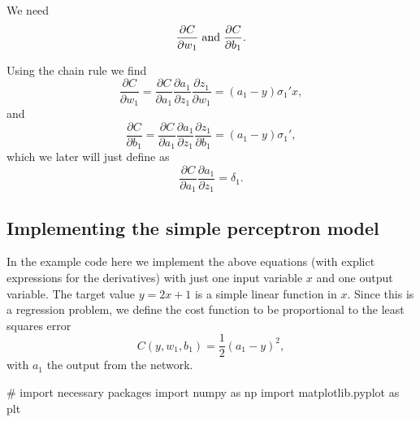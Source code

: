 \documentclass[%
oneside,                 %
final,                   %
10pt]{article}
\begin{document}
We need
\[
\frac{\partial C}{\partial w_1} \hspace{0.1cm}\mathrm{and}\hspace{0.1cm}\frac{\partial C}{\partial b_1}. 
\]

Using the chain rule we find 
\[
\frac{\partial C}{\partial w_1}=\frac{\partial C}{\partial a_1}\frac{\partial a_1}{\partial z_1}\frac{\partial z_1}{\partial w_1}=(a_1-y)\sigma_1'x,
\]
and
\[
\frac{\partial C}{\partial b_1}=\frac{\partial C}{\partial a_1}\frac{\partial a_1}{\partial z_1}\frac{\partial z_1}{\partial b_1}=(a_1-y)\sigma_1',
\]
which we later will just define as
\[
\frac{\partial C}{\partial a_1}\frac{\partial a_1}{\partial z_1}=\delta_1.
\]

\subsection{Implementing the simple perceptron model}

In the example code here we implement the above equations (with explict
expressions for the derivatives) with just one input variable $x$ and
one output variable.  The target value $y=2x+1$ is a simple linear
function in $x$. Since this is a regression problem, we define the cost function to be proportional to the least squares error
\[
C(y,w_1,b_1)=\frac{1}{2}(a_1-y)^2,
\]
with $a_1$ the output from the network.





















































\bpycod
# import necessary packages
import numpy as np
import matplotlib.pyplot as plt
\end{document}
